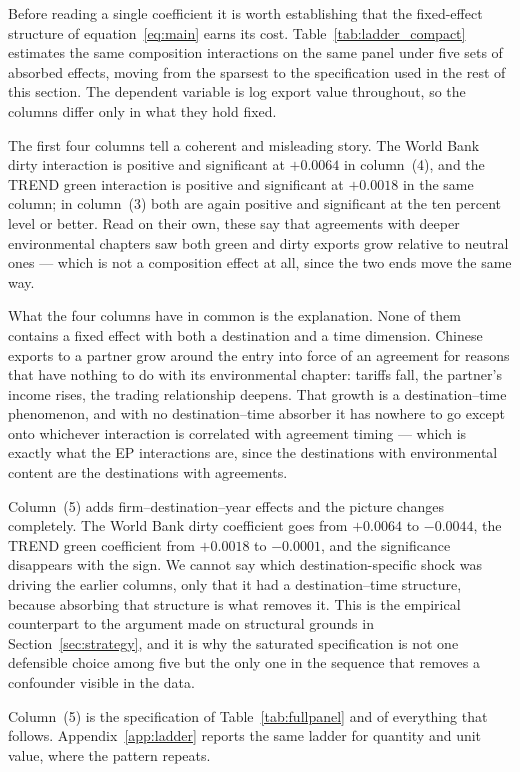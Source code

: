 \documentclass[12pt]{article}
\begin{document}
Before reading a single coefficient it is worth establishing that the fixed-effect structure of
equation~\eqref{eq:main} earns its cost. Table~\ref{tab:ladder_compact} estimates the same
composition interactions on the same panel under five sets of absorbed effects, moving from the
sparsest to the specification used in the rest of this section. The dependent variable is log export
value throughout, so the columns differ only in what they hold fixed.

The first four columns tell a coherent and misleading story. The World Bank dirty interaction is
positive and significant at $+0.0064$ in column~(4), and the TREND green interaction is positive and
significant at $+0.0018$ in the same column; in column~(3) both are again positive and significant
at the ten percent level or better. Read on their own, these say that agreements with deeper environmental chapters
saw both green and dirty exports grow relative to neutral ones --- which is not a composition effect
at all, since the two ends move the same way.

What the four columns have in common is the explanation. None of them contains a fixed effect with
both a destination and a time dimension. Chinese exports to a partner grow around the entry into
force of an agreement for reasons that have nothing to do with its environmental chapter: tariffs
fall, the partner's income rises, the trading relationship deepens. That growth is a
destination--time phenomenon, and with no destination--time absorber it has nowhere to go except onto
whichever interaction is correlated with agreement timing --- which is exactly what the EP
interactions are, since the destinations with environmental content are the destinations with
agreements.

Column~(5) adds firm--destination--year effects and the picture changes completely. The World Bank
dirty coefficient goes from $+0.0064$ to $-0.0044$, the TREND green coefficient from $+0.0018$ to
$-0.0001$, and the significance disappears with the sign. We cannot say which destination-specific
shock was driving the earlier columns, only that it had a destination--time structure, because
absorbing that structure is what removes it. This is the empirical counterpart to the argument made
on structural grounds in Section~\ref{sec:strategy}, and it is why the saturated specification is not
one defensible choice among five but the only one in the sequence that removes a confounder visible
in the data.

Column~(5) is the specification of Table~\ref{tab:fullpanel} and of everything that follows.
Appendix~\ref{app:ladder} reports the same ladder for quantity and unit value, where the pattern
repeats.
\end{document}
